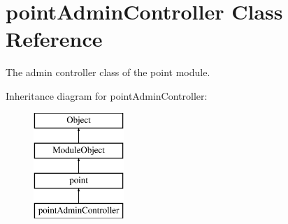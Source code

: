 \hypertarget{classpointAdminController}{}\section{point\+Admin\+Controller Class Reference}
\label{classpointAdminController}


The admin controller class of the point module.  


Inheritance diagram for point\+Admin\+Controller\+:\begin{figure}[H]
\begin{center}
\leavevmode
\includegraphics[height=4.000000cm]{classpointAdminController}
\end{center}
\end{figure}
